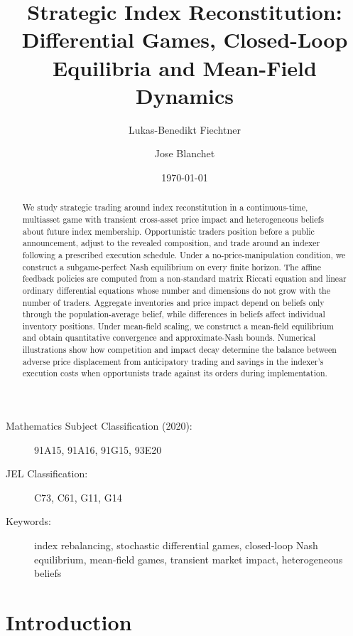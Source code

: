 \documentclass[12pt]{article}
\title{Strategic Index Reconstitution: Differential Games, Closed-Loop Equilibria and Mean-Field Dynamics}
\author[1]{Lukas-Benedikt Fiechtner}
\author[1,2]{Jose Blanchet}
\affil[1]{Institute for Computational and Mathematical Engineering, Stanford University}
\affil[2]{Department of Management Science and Engineering, Stanford University}
\date{\today}
\numberwithin{equation}{section}
\theoremstyle{definition}
\begin{document}
\vspace{-0.5cm}
\maketitle

\begin{abstract}
We study strategic trading around index reconstitution in a continuous-time,
multiasset game with transient cross-asset price impact and heterogeneous
beliefs about future index membership. Opportunistic traders position before
a public announcement, adjust to the revealed composition, and trade around
an indexer following a prescribed execution schedule. Under a
no-price-manipulation condition, we construct a subgame-perfect
Nash equilibrium on every finite horizon. The affine feedback policies are
computed from a non-standard matrix Riccati equation and linear ordinary differential
equations whose number and dimensions do not grow with the number of traders.
Aggregate inventories and price impact depend on beliefs only through the
population-average belief, while differences in beliefs affect individual
inventory positions. Under mean-field scaling, we construct a
mean-field equilibrium and obtain quantitative convergence and
approximate-Nash bounds. Numerical illustrations show how competition and impact
decay determine the balance between adverse price displacement from
anticipatory trading and savings in the indexer's execution costs when
opportunists trade against its orders during implementation.
\end{abstract}

\begin{description}
\item[Mathematics Subject Classification (2020):] 91A15, 91A16, 91G15, 93E20
\item[JEL Classification:] C73, C61, G11, G14
\item[Keywords:] index rebalancing, stochastic differential games, closed-loop Nash equilibrium, mean-field games, transient market impact, heterogeneous beliefs
\end{description}

\bigskip

\section{Introduction}\label{sec:introduction}
\end{document}
